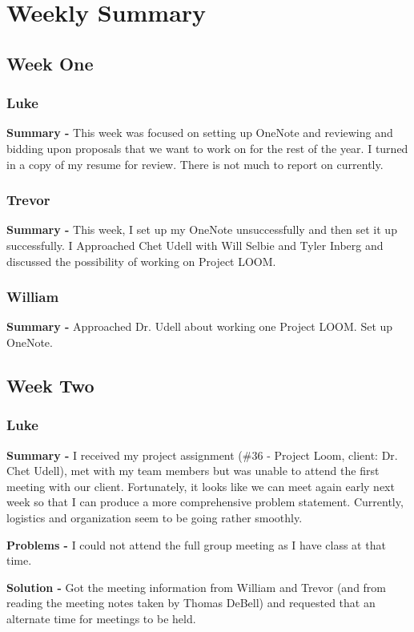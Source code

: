 \documentclass[onecolumn, draftclsnofoot,10pt, compsoc]{IEEEtran}
\begin{document}
\section{Weekly Summary}

\subsection{Week One}
\subsubsection*{Luke}
    \begin{adjustwidth}{2.5em}{0pt}
    \textbf{Summary -} This week was focused on setting up OneNote and reviewing and bidding upon proposals that we want to work on for the rest of the year. I turned in a copy of my resume for review. There is not much to report on currently.
    \end{adjustwidth}
\subsubsection*{Trevor}
    \begin{adjustwidth}{2.5em}{0pt}
    \textbf{Summary -} This week, I set up my OneNote unsuccessfully and then set it up successfully. I Approached Chet Udell with Will Selbie and Tyler Inberg and discussed the possibility of working on Project LOOM.
    \end{adjustwidth}
\subsubsection*{William}
    \begin{adjustwidth}{2.5em}{0pt}
    \textbf{Summary -} Approached Dr. Udell about working one Project LOOM. Set up OneNote.
    \end{adjustwidth}



\subsection{Week Two}
\subsubsection*{Luke}
    \begin{adjustwidth}{2.5em}{0pt}
    \textbf{Summary -} I received my project assignment (\#36 - Project Loom, client: Dr. Chet Udell), met with my team members but was unable to attend the first meeting with our client. Fortunately, it looks like we can meet again early next week so that I can produce a more comprehensive problem statement. Currently, logistics and organization seem to be going rather smoothly.
    
    \textbf{Problems -} I could not attend the full group meeting as I have class at that time.
    \end{adjustwidth}
    \begin{adjustwidth}{5em}{0pt}
    \textbf{Solution -} Got the meeting information from William and Trevor (and from reading the meeting notes taken by Thomas DeBell) and requested that an alternate time for meetings to be held.    
    \end{adjustwidth}
\end{document}

